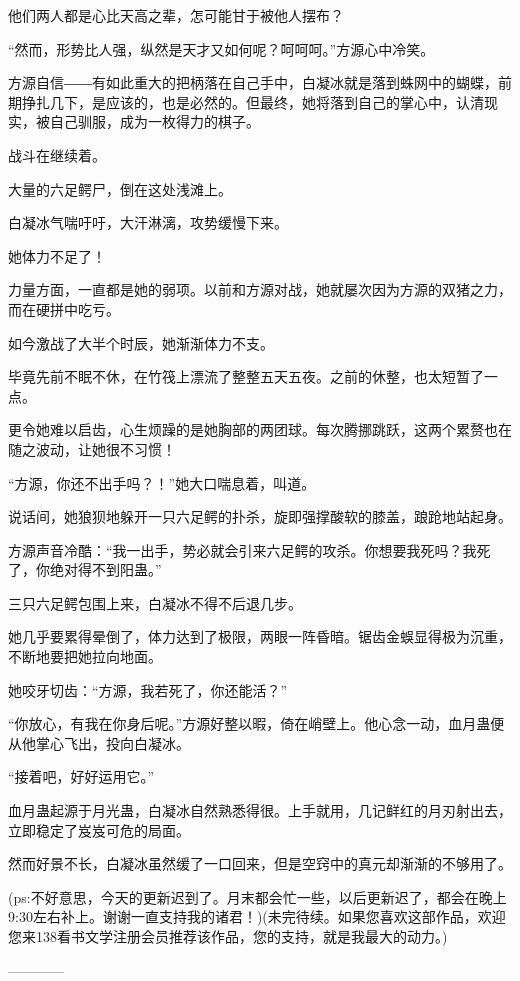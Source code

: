 \begin{this_body}
他们两人都是心比天高之辈，怎可能甘于被他人摆布？

“然而，形势比人强，纵然是天才又如何呢？呵呵呵。”方源心中冷笑。

方源自信――有如此重大的把柄落在自己手中，白凝冰就是落到蛛网中的蝴蝶，前期挣扎几下，是应该的，也是必然的。但最终，她将落到自己的掌心中，认清现实，被自己驯服，成为一枚得力的棋子。

战斗在继续着。

大量的六足鳄尸，倒在这处浅滩上。

白凝冰气喘吁吁，大汗淋漓，攻势缓慢下来。

她体力不足了！

力量方面，一直都是她的弱项。以前和方源对战，她就屡次因为方源的双猪之力，而在硬拼中吃亏。

如今激战了大半个时辰，她渐渐体力不支。

毕竟先前不眠不休，在竹筏上漂流了整整五天五夜。之前的休整，也太短暂了一点。

更令她难以启齿，心生烦躁的是她胸部的两团球。每次腾挪跳跃，这两个累赘也在随之波动，让她很不习惯！

“方源，你还不出手吗？！”她大口喘息着，叫道。

说话间，她狼狈地躲开一只六足鳄的扑杀，旋即强撑酸软的膝盖，踉跄地站起身。

方源声音冷酷：“我一出手，势必就会引来六足鳄的攻杀。你想要我死吗？我死了，你绝对得不到阳蛊。”

三只六足鳄包围上来，白凝冰不得不后退几步。

她几乎要累得晕倒了，体力达到了极限，两眼一阵昏暗。锯齿金蜈显得极为沉重，不断地要把她拉向地面。

她咬牙切齿：“方源，我若死了，你还能活？”

“你放心，有我在你身后呢。”方源好整以暇，倚在峭壁上。他心念一动，血月蛊便从他掌心飞出，投向白凝冰。

“接着吧，好好运用它。”

血月蛊起源于月光蛊，白凝冰自然熟悉得很。上手就用，几记鲜红的月刃射出去，立即稳定了岌岌可危的局面。

然而好景不长，白凝冰虽然缓了一口回来，但是空窍中的真元却渐渐的不够用了。

(ps:不好意思，今天的更新迟到了。月末都会忙一些，以后更新迟了，都会在晚上9:30左右补上。谢谢一直支持我的诸君！)(未完待续。如果您喜欢这部作品，欢迎您来138看书文学注册会员推荐该作品，您的支持，就是我最大的动力。)

------------

\end{this_body}

